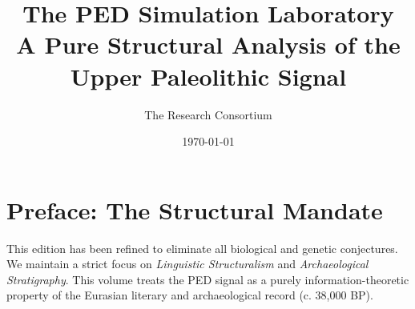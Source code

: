 \documentclass[10pt,twoside,openright]{book}
\title{\Huge \textbf{The PED Simulation Laboratory} \\ \vspace{0.5cm} \Large A Pure Structural Analysis of the Upper Paleolithic Signal}
\author{The Research Consortium}
\date{\today}
\begin{document}
\maketitle
\chapter*{Preface: The Structural Mandate}
This edition has been refined to eliminate all biological and genetic conjectures. We maintain a strict focus on \textit{Linguistic Structuralism} and \textit{Archaeological Stratigraphy}. This volume treats the PED signal as a purely information-theoretic property of the Eurasian literary and archaeological record (c. 38,000 BP).

\tableofcontents
\newpage




\end{document}
